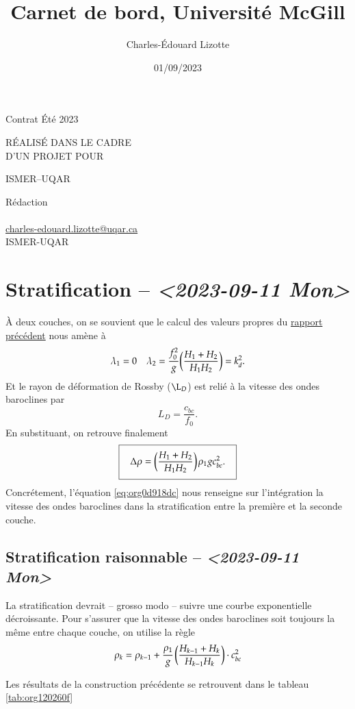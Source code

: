 \documentclass[10pt]{article}
\author{Charles-Édouard Lizotte}
\date{01/09/2023}
\title{Carnet de bord, Université McGill}
\makeatletter
\numberwithin{equation}{section}
\newcommand{\pt}{\hspace{1pt}}
\newcommand{\venti}{\vphantom{\sum_x^x}}
\newcommand{\mytitlepage}{
\begin{titlepage}
\begin{center}
{\Large Contrat Été 2023 \par}
\vspace{2cm}
{\Large \MakeUppercase{\thetitle} \par}
\vspace{2cm}
RÉALISÉ DANS LE CADRE\\ D'UN PROJET POUR \par
\vspace{2cm}
{\Large ISMER--UQAR \par}
\vspace{2cm}
{\thedate}
\end{center}
\vfill
Rédaction \\
{\theauthor}\\
\url{charles-edouard.lizotte@uqar.ca}\\
ISMER-UQAR
\end{titlepage}
}
\makeatother
\begin{document}
\mytitlepage
\tableofcontents\newpage

\section{Stratification -- \textit{<2023-09-11 Mon>}}
\label{sec:orga18fb9e}
À deux couches, on se souvient que le calcul des valeurs propres du \href{rapport-2023-09-01.pdf}{rapport précédent} nous amène à
\begin{align}
   && \lambda_1 = 0 && \lambda_2 = \frac{f_0^2}{g} \qty(\frac{H_1+H_2}{H_1 H_2}) = k_d^2. &&
\end{align}
Et le rayon de déformation de Rossby (\(\L_D\)) est relié à la vitesse des ondes baroclines par
\begin{equation}
   L_D = \frac{c_{bc}}{f_0}.
\end{equation}
En substituant, on retrouve finalement
\begin{equation}
\label{eq:org0d918dc}
   \boxed{\hspace{0.3cm}\Delta\rho = \qty(\frac{H_1+H_2}{H_1H_2})\pt\rho_1 g c_{bc}^2.\venti\hspace{0.3cm}}
\end{equation}
Concrétement, l'équation \ref{eq:org0d918dc} nous renseigne sur l'intégration la vitesse des ondes baroclines dans la stratification entre la première et la seconde couche.

\subsection{Stratification raisonnable -- \textit{<2023-09-11 Mon>}}
\label{sec:org517014e}
La stratification devrait -- grosso modo -- suivre une courbe exponentielle décroissante.
Pour s'assurer que la vitesse des ondes baroclines soit toujours la même entre chaque couche, on utilise la règle
\begin{equation}
   \rho_k = \rho_{k-1} + \frac{\rho_1}{g}\pt\qty(\frac{H_{k-1}+H_k}{H_{k-1}H_k})\cdot c_{bc}^2
\end{equation}

Les résultats de la construction précédente se retrouvent dans le tableau \ref{tab:org120260f}
\end{document}
